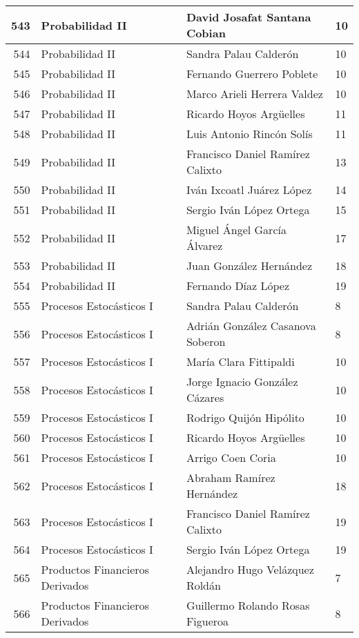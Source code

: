 \begin{table}[ht]
\begin{tabular}{rlll}
  543 & Probabilidad II & David Josafat Santana Cobian & 10 \\ \hline
  544 & Probabilidad II & Sandra Palau Calderón & 10 \\ \hline
  545 & Probabilidad II & Fernando Guerrero Poblete & 10 \\ \hline
  546 & Probabilidad II & Marco Arieli Herrera Valdez & 10 \\ \hline
  547 & Probabilidad II & Ricardo Hoyos Argüelles & 11 \\ \hline
  548 & Probabilidad II & Luis Antonio Rincón Solís & 11 \\ \hline
  549 & Probabilidad II & Francisco Daniel Ramírez Calixto & 13 \\ \hline
  550 & Probabilidad II & Iván Ixcoatl Juárez López & 14 \\ \hline
  551 & Probabilidad II & Sergio Iván López Ortega & 15 \\ \hline
  552 & Probabilidad II & Miguel Ángel García Álvarez & 17 \\ \hline
  553 & Probabilidad II & Juan González Hernández & 18 \\ \hline
  554 & Probabilidad II & Fernando Díaz López & 19 \\ \hline
  555 & Procesos Estocásticos I & Sandra Palau Calderón & 8 \\ \hline
  556 & Procesos Estocásticos I & Adrián González Casanova Soberon & 8 \\ \hline
  557 & Procesos Estocásticos I & María Clara Fittipaldi & 10 \\ \hline
  558 & Procesos Estocásticos I & Jorge Ignacio González Cázares & 10 \\ \hline
  559 & Procesos Estocásticos I & Rodrigo Quijón Hipólito & 10 \\ \hline
  560 & Procesos Estocásticos I & Ricardo Hoyos Argüelles & 10 \\ \hline
  561 & Procesos Estocásticos I & Arrigo Coen Coria & 10 \\ \hline
  562 & Procesos Estocásticos I & Abraham Ramírez Hernández & 18 \\ \hline
  563 & Procesos Estocásticos I & Francisco Daniel Ramírez Calixto & 19 \\ \hline
  564 & Procesos Estocásticos I & Sergio Iván López Ortega & 19 \\ \hline
  565 & Productos Financieros Derivados & Alejandro Hugo Velázquez Roldán & 7 \\ \hline
  566 & Productos Financieros Derivados & Guillermo Rolando Rosas Figueroa & 8 \\ \hline

\end{tabular}
\end{table}
